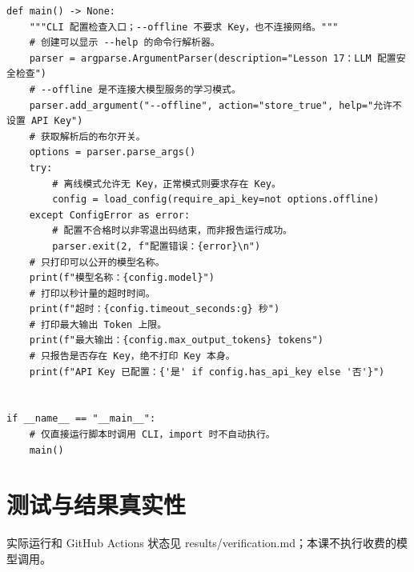 \documentclass[UTF8,11pt,a4paper]{ctexart}
\begin{document}
\begin{Verbatim}[fontsize=\scriptsize,breaklines=true,breakanywhere=true]
def main() -> None:
    """CLI 配置检查入口；--offline 不要求 Key，也不连接网络。"""
    # 创建可以显示 --help 的命令行解析器。
    parser = argparse.ArgumentParser(description="Lesson 17：LLM 配置安全检查")
    # --offline 是不连接大模型服务的学习模式。
    parser.add_argument("--offline", action="store_true", help="允许不设置 API Key")
    # 获取解析后的布尔开关。
    options = parser.parse_args()
    try:
        # 离线模式允许无 Key，正常模式则要求存在 Key。
        config = load_config(require_api_key=not options.offline)
    except ConfigError as error:
        # 配置不合格时以非零退出码结束，而非报告运行成功。
        parser.exit(2, f"配置错误：{error}\n")
    # 只打印可以公开的模型名称。
    print(f"模型名称：{config.model}")
    # 打印以秒计量的超时时间。
    print(f"超时：{config.timeout_seconds:g} 秒")
    # 打印最大输出 Token 上限。
    print(f"最大输出：{config.max_output_tokens} tokens")
    # 只报告是否存在 Key，绝不打印 Key 本身。
    print(f"API Key 已配置：{'是' if config.has_api_key else '否'}")


if __name__ == "__main__":
    # 仅直接运行脚本时调用 CLI，import 时不自动执行。
    main()
\end{Verbatim}
\section{测试与结果真实性}
实际运行和 GitHub Actions 状态见 results/verification.md；本课不执行收费的模型调用。
\end{document}
